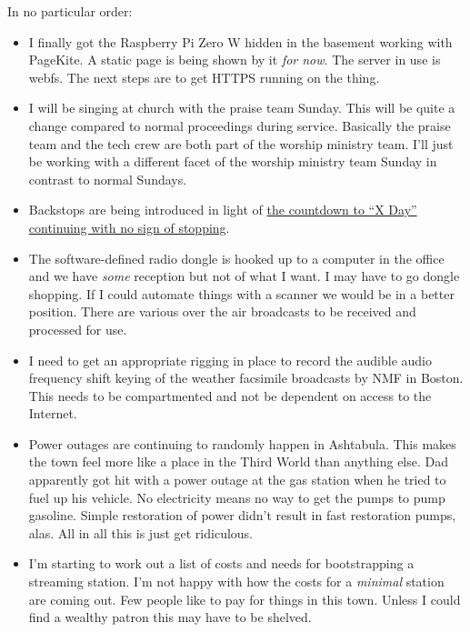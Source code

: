 In no particular order:

\begin{itemize}
\tightlist
\item
  I finally got the Raspberry Pi Zero W hidden in the basement working
  with PageKite. A static page is being shown by it \emph{for now}. The
  server in use is webfs. The next steps are to get HTTPS running on the
  thing.
\item
  I will be singing at church with the praise team Sunday. This will be
  quite a change compared to normal proceedings during service.
  Basically the praise team and the tech crew are both part of the
  worship ministry team. I'll just be working with a different facet of
  the worship ministry team Sunday in contrast to normal Sundays.
\item
  Backstops are being introduced in light of
  \href{https://en.wikipedia.org/wiki/2023_United_States_debt-ceiling_crisis}{the
  countdown to ``X Day'' continuing with no sign of stopping}.
\item
  The software-defined radio dongle is hooked up to a computer in the
  office and we have \emph{some} reception but not of what I want. I may
  have to go dongle shopping. If I could automate things with a scanner
  we would be in a better position. There are various over the air
  broadcasts to be received and processed for use.
\item
  I need to get an appropriate rigging in place to record the audible
  audio frequency shift keying of the weather facsimile broadcasts by
  NMF in Boston. This needs to be compartmented and not be dependent on
  access to the Internet.
\item
  Power outages are continuing to randomly happen in Ashtabula. This
  makes the town feel more like a place in the Third World than anything
  else. Dad apparently got hit with a power outage at the gas station
  when he tried to fuel up his vehicle. No electricity means no way to
  get the pumps to pump gasoline. Simple restoration of power didn't
  result in fast restoration pumps, alas. All in all this is just get
  ridiculous.
\item
  I'm starting to work out a list of costs and needs for bootstrapping a
  streaming station. I'm not happy with how the costs for a
  \emph{minimal} station are coming out. Few people like to pay for
  things in this town. Unless I could find a wealthy patron this may
  have to be shelved.
\end{itemize}
